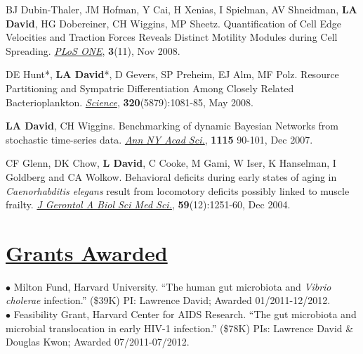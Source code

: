 \documentclass[overlapped,line,11pt]{res}
\begin{document}
\begin{resume}
\begin{revnumerate}[11]
\vspace*{1mm}
\item { BJ Dubin-Thaler, JM Hofman, Y Cai, H Xenias, I Spielman, AV
  Shneidman, \textbf{LA David}, HG Dobereiner, CH Wiggins, MP Sheetz.
  Quantification of Cell Edge Velocities and Traction Forces Reveals
  Distinct Motility Modules during Cell Spreading. \emph{\underline{PLoS ONE}},
  \textbf{3}(11), Nov 2008.}

\vspace*{1mm}
\item {DE Hunt*, \textbf{LA David}*, D Gevers, SP Preheim, EJ Alm, MF
Polz.  Resource Partitioning and Sympatric Differentiation Among
Closely Related Bacterioplankton.  \emph{\underline{Science}},
\textbf{320}(5879):1081-85, May 2008.}

\vspace*{1mm}
\item {\textbf{LA David}, CH Wiggins. Benchmarking of dynamic Bayesian
  Networks from stochastic time-series data. \emph{\underline{Ann NY Acad Sci.}},
  \textbf{1115} 90-101, Dec 2007.}

\vspace*{1mm}
\item {CF Glenn, DK Chow, \textbf{L David}, C Cooke, M Gami, W Iser, K
  Hanselman, I Goldberg and CA Wolkow. Behavioral deficits during
  early states of aging in {\em Caenorhabditis elegans} result from
  locomotory deficits possibly linked to muscle frailty. \emph{\underline{J
    Gerontol A Biol Sci Med Sci.}}, \textbf{59}(12):1251-60, Dec 2004.}
\end{revnumerate}

\section{\underline{\sc Grants Awarded}} 
\vspace{.05in}

\hangindent=0.5in $\bullet$\hspace{.1in} Milton Fund, Harvard
University. ``The human gut microbiota and \emph{Vibrio cholerae}
infection.'' (\$39K) PI: Lawrence David; Awarded 01/2011-12/2012. \\

\vspace{-10mm}
\hangindent=0.5in $\bullet$\hspace{.1in} Feasibility Grant, Harvard
Center for AIDS Research. ``The gut microbiota and microbial
translocation in early HIV-1 infection.'' (\$78K) PIs: Lawrence David
\& Douglas Kwon; Awarded 07/2011-07/2012.


\end{resume}
\end{document}
